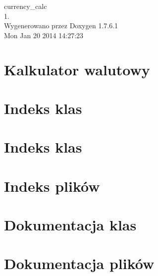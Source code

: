 \documentclass[a4paper]{book}
\begin{document}
\hypersetup{pageanchor=false,citecolor=blue}
\begin{titlepage}
\vspace*{7cm}
\begin{center}
{\Large currency\-\_\-calc \\[1ex]\large 1. }\\
\vspace*{1cm}
{\large \-Wygenerowano przez Doxygen 1.7.6.1}\\
\vspace*{0.5cm}
{\small Mon Jan 20 2014 14:27:23}\\
\end{center}
\end{titlepage}
\clearemptydoublepage
{}
\tableofcontents
\clearemptydoublepage
{}
\hypersetup{pageanchor=true,citecolor=blue}
\chapter{\-Kalkulator walutowy}
\label{index}\hypertarget{index}{}
\chapter{\-Indeks klas}

\chapter{\-Indeks klas}

\chapter{\-Indeks plików}

\chapter{\-Dokumentacja klas}















\chapter{\-Dokumentacja plików}































\printindex
\end{document}
